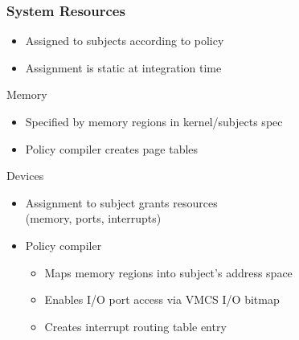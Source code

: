\documentclass[xcolor={dvipsnames}]{beamer}
\begin{document}
\begin{frame}\frametitle{System Resources}
\begin{itemize}
	\item Assigned to subjects according to policy
	\item Assignment is static at integration time
\end{itemize}
\begin{block}{Memory}
	\begin{itemize}
		\item Specified by memory regions in kernel/subjects spec
		\item Policy compiler creates page tables
	\end{itemize}
\end{block}

\begin{block}{Devices}
	\begin{itemize}
		\item Assignment to subject grants resources\\(memory, ports, interrupts)
		\item Policy compiler
		\begin{itemize}
			\item Maps memory regions into subject's address space
			\item Enables I/O port access via VMCS I/O bitmap
			\item Creates interrupt routing table entry
		\end{itemize}
	\end{itemize}
\end{block}
\end{frame}
\end{document}
